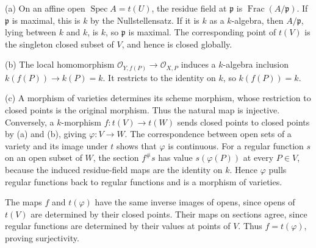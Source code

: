 (a) On an affine open $\operatorname{Spec}A=t(U)$, the residue field at $\mathfrak p$ is $\operatorname{Frac}(A/\mathfrak p)$. If $\mathfrak p$ is maximal, this is $k$ by the Nullstellensatz. If it is $k$ as a $k$-algebra, then $A/\mathfrak p$, lying between $k$ and $k$, is $k$, so $\mathfrak p$ is maximal. The corresponding point of $t(V)$ is the singleton closed subset of $V$, and hence is closed globally.

(b) The local homomorphism $\mathcal O_{Y,f(P)}\to\mathcal O_{X,P}$ induces a $k$-algebra inclusion $k(f(P))\to k(P)=k$. It restricts to the identity on $k$, so $k(f(P))=k$.

(c) A morphism of varieties determines its scheme morphism, whose restriction to closed points is the original morphism. Thus the natural map is injective. Conversely, a $k$-morphism $f:t(V)\to t(W)$ sends closed points to closed points by (a) and (b), giving $\varphi:V\to W$. The correspondence between open sets of a variety and its image under $t$ shows that $\varphi$ is continuous. For a regular function $s$ on an open subset of $W$, the section $f^\#s$ has value $s(\varphi(P))$ at every $P\in V$, because the induced residue-field maps are the identity on $k$. Hence $\varphi$ pulls regular functions back to regular functions and is a morphism of varieties.

The maps $f$ and $t(\varphi)$ have the same inverse images of opens, since opens of $t(V)$ are determined by their closed points. Their maps on sections agree, since regular functions are determined by their values at points of $V$. Thus $f=t(\varphi)$, proving surjectivity.
